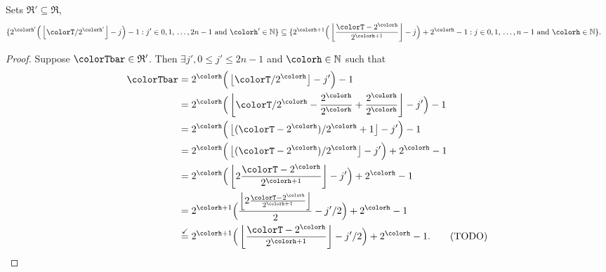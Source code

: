 \begin{sublemma}
\label{thm:tilted-subsetr}
Sets $\mathfrak{R}' \subseteq \mathfrak{R}$,
\begin{align*}
\{
  2^{\colorh'}\Big(\left\lfloor \colorT / 2^{\colorh'} \right\rfloor - j\Big) - 1
  :
  j' \in 0,1,\,\ldots,2n-1
  \text{ and }
  \colorh' \in \mathbb{N}
\}
&\subseteq
\{
  2^{\colorh + 1}\Big( \left\lfloor\frac{\colorT - 2^{\colorh}}{2^{\colorh + 1}} \right\rfloor - j\Big) + 2^{\colorh} - 1
  :
  j \in 0,1,\,\ldots,n-1
  \text{ and }
  \colorh \in \mathbb{N}
\}.
\end{align*}

\end{sublemma}
\begin{proof}
Suppose $\colorTbar \in \mathfrak{R}'$.
Then $\exists j',  0 \leq j' \leq 2n - 1$ and $\colorh \in \mathbb{N}$ such that
\begin{align*}
\colorTbar
&= 2^{\colorh}\Big(\left\lfloor \colorT / 2^{\colorh} \right\rfloor - j'\Big) - 1\\
&= 2^{\colorh}\Big(\left\lfloor \colorT / 2^{\colorh} - \frac{2^{\colorh}}{2^{\colorh}} + \frac{2^{\colorh}}{2^{\colorh}} \right\rfloor - j'\Big) - 1\\
&= 2^{\colorh}\Big(\left\lfloor (\colorT - 2^{\colorh}) / 2^{\colorh}  + 1 \right\rfloor - j'\Big) - 1\\
&= 2^{\colorh}\Big(\left\lfloor (\colorT - 2^{\colorh}) / 2^{\colorh} \right\rfloor - j'\Big) + 2^{\colorh} - 1\\
&= 2^{\colorh}\Big(\left\lfloor 2\frac{\colorT - 2^{\colorh}}{2^{\colorh+1}} \right\rfloor - j'\Big) + 2^{\colorh} - 1\\
&= 2^{\colorh+1}\Big(
  \frac{\left\lfloor 2\frac{\colorT - 2^{\colorh}}{2^{\colorh+1}} \right\rfloor}{2} - j'/2
\Big) + 2^{\colorh} - 1\\
&\stackrel{\checkmark}{=} 2^{\colorh+1}\Big(
  \left\lfloor\frac{\colorT - 2^{\colorh}}{2^{\colorh+1}} \right\rfloor - j'/2
\Big) + 2^{\colorh} - 1.  \tag{TODO}
\end{align*}



\end{proof}
